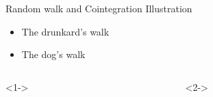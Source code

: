 \documentclass{beamer}
\begin{document}
\begin{frame}[t,fragile]{Random walk and Cointegration Illustration}
 \begin{itemize}
  \item<1-> The drunkard's walk
  \item<2-> The dog's walk
 \end{itemize}
 
\begin{columns}
\begin{column}{.4\linewidth}<1->
\begin{center}
\end{center}
\end{column}
\begin{column}{.08\linewidth}<2->
        \begin{tikzpicture}[overlay]

\end{tikzpicture}
\end{column}
\end{columns}
\end{frame}
\end{document}
